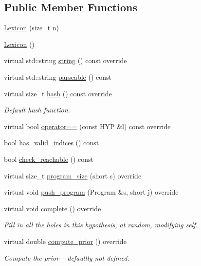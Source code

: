 \subsection*{Public Member Functions}
\begin{DoxyCompactItemize}
\item 
\hyperlink{class_lexicon_a06bafc4711d145a026fe03e9e1168ae8}{Lexicon} (size\+\_\+t n)
\item 
\hyperlink{class_lexicon_ab027c90715b8616af424c6682cdfef0f}{Lexicon} ()
\item 
virtual std\+::string \hyperlink{class_lexicon_a5c584d2885a21542082332a26eb0961b}{string} () const override
\item 
virtual std\+::string \hyperlink{class_lexicon_a0ed99caee19dc82e57e80b290abd239a}{parseable} () const
\item 
virtual size\+\_\+t \hyperlink{class_lexicon_afbefa510e623ee4a407a1e1e04f42fb2}{hash} () const override
\begin{DoxyCompactList}\small\item\em Default hash function. \end{DoxyCompactList}\item 
virtual bool \hyperlink{class_lexicon_abd4b0dead3757288e80f37773820f513}{operator==} (const H\+YP \&l) const override
\item 
bool \hyperlink{class_lexicon_a7b8ca67607285cc14608bd7148953d91}{has\+\_\+valid\+\_\+indices} () const
\item 
bool \hyperlink{class_lexicon_a1e58bf42fb2388eff629bc899d8ef5ed}{check\+\_\+reachable} () const
\item 
virtual size\+\_\+t \hyperlink{class_lexicon_a005225141f8a245fe33d8f0a58fd397a}{program\+\_\+size} (short s) override
\item 
virtual void \hyperlink{class_lexicon_acd367c70ccc583f2a9fcbb1d007db45c}{push\+\_\+program} (Program \&s, short j) override
\item 
virtual void \hyperlink{class_lexicon_a724ccdaffe9090488bfaa786873fa807}{complete} () override
\begin{DoxyCompactList}\small\item\em Fill in all the holes in this hypothesis, at random, modifying self. \end{DoxyCompactList}\item 
virtual double \hyperlink{class_lexicon_a2e099a68dd08d62897b40647f92eba1c}{compute\+\_\+prior} () override
\begin{DoxyCompactList}\small\item\em Compute the prior -- defaultly not defined. \end{DoxyCompactList}\item 

\end{DoxyCompactItemize}
